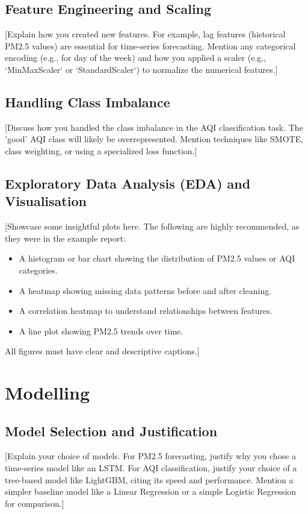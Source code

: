 \documentclass[11pt, a4paper]{article}
\begin{document}
\subsection{Feature Engineering and Scaling}
[Explain how you created new features. For example, lag features (historical PM2.5 values) are essential for time-series forecasting. Mention any categorical encoding (e.g., for day of the week) and how you applied a scaler (e.g., `MinMaxScaler` or `StandardScaler`) to normalize the numerical features.]

\subsection{Handling Class Imbalance}
[Discuss how you handled the class imbalance in the AQI classification task. The 'good' AQI class will likely be overrepresented. Mention techniques like SMOTE, class weighting, or using a specialized loss function.]

\subsection{Exploratory Data Analysis (EDA) and Visualisation}
[Showcase some insightful plots here. The following are highly recommended, as they were in the example report:
\begin{itemize}
    \item A histogram or bar chart showing the distribution of PM2.5 values or AQI categories.
    \item A heatmap showing missing data patterns before and after cleaning.
    \item A correlation heatmap to understand relationships between features.
    \item A line plot showing PM2.5 trends over time.
\end{itemize}
All figures must have clear and descriptive captions.]

\section{Modelling}

\subsection{Model Selection and Justification}
[Explain your choice of models. For PM2.5 forecasting, justify why you chose a time-series model like an LSTM. For AQI classification, justify your choice of a tree-based model like LightGBM, citing its speed and performance. Mention a simpler baseline model like a Linear Regression or a simple Logistic Regression for comparison.]
\end{document}
